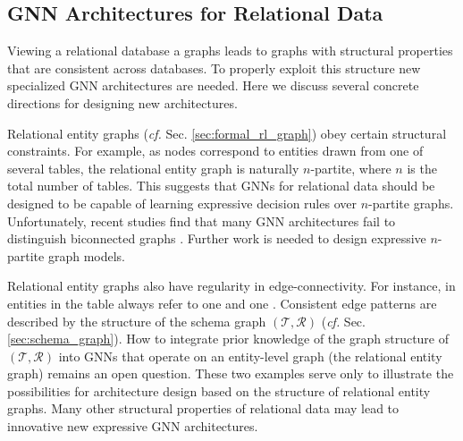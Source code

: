 \subsection{GNN Architectures for Relational Data}\label{sec: new gnns}

Viewing a relational database a graphs leads to graphs with structural properties that are consistent across databases. To properly exploit this structure new specialized GNN architectures are needed. Here we discuss several concrete directions for designing new architectures.

 Relational entity graphs (\emph{cf.} Sec. \ref{sec:formal_rl_graph}) obey certain structural constraints. For example, as nodes correspond to entities drawn from one of several tables, the relational entity graph is naturally $n$-partite, where $n$ is the total number of tables.  This suggests that GNNs for relational data should be designed to be capable of learning expressive decision rules over $n$-partite graphs. Unfortunately,  recent studies find that many GNN architectures fail to distinguish biconnected graphs \citep{zhang2023rethinking}. Further work is needed to design expressive $n$-partite graph models.

Relational entity graphs also have regularity in edge-connectivity. For instance, in \Amazon entities in the  table always refer to one  and one .
Consistent edge patterns are described by the structure of the schema graph $(\mathcal T, \mathcal R)$ (\emph{cf.} Sec. \ref{sec:schema_graph}). How to integrate prior knowledge of the graph structure of $(\mathcal T, \mathcal R)$ into GNNs that operate on an entity-level graph (the relational entity graph) remains an open question. These two examples serve only to illustrate the possibilities for architecture design based on the structure of relational entity graphs. Many other structural properties of relational data may lead to innovative new expressive GNN architectures.


